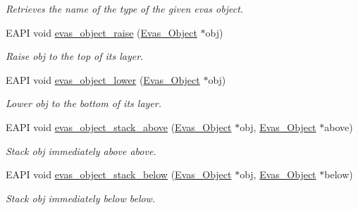\begin{DoxyCompactItemize}
\begin{DoxyCompactList}\small\item\em Retrieves the name of the type of the given evas object. \item\end{DoxyCompactList}\item 
EAPI void \hyperlink{group__Evas__Object__Group__Basic_ga7a99128189105d042cf6b4fefca9b60e}{evas\_\-object\_\-raise} (\hyperlink{group__Evas__Object__Group_ga9e19e6dd1f517a0ba437c0114d3e7c97}{Evas\_\-Object} $\ast$obj)
\begin{DoxyCompactList}\small\item\em Raise {\ttfamily obj} to the top of its layer. \item\end{DoxyCompactList}\item 
EAPI void \hyperlink{group__Evas__Object__Group__Basic_gae5ede5671799a140e3d3f7bb7ea7f14f}{evas\_\-object\_\-lower} (\hyperlink{group__Evas__Object__Group_ga9e19e6dd1f517a0ba437c0114d3e7c97}{Evas\_\-Object} $\ast$obj)
\begin{DoxyCompactList}\small\item\em Lower {\ttfamily obj} to the bottom of its layer. \item\end{DoxyCompactList}\item 
EAPI void \hyperlink{group__Evas__Object__Group__Basic_ga1128fb1e04b1de059e9ccade58c83663}{evas\_\-object\_\-stack\_\-above} (\hyperlink{group__Evas__Object__Group_ga9e19e6dd1f517a0ba437c0114d3e7c97}{Evas\_\-Object} $\ast$obj, \hyperlink{group__Evas__Object__Group_ga9e19e6dd1f517a0ba437c0114d3e7c97}{Evas\_\-Object} $\ast$above)
\begin{DoxyCompactList}\small\item\em Stack {\ttfamily obj} immediately above {\ttfamily above}. \item\end{DoxyCompactList}\item 
EAPI void \hyperlink{group__Evas__Object__Group__Basic_ga8cc69c6e6d78d686d8c4606ac03c2864}{evas\_\-object\_\-stack\_\-below} (\hyperlink{group__Evas__Object__Group_ga9e19e6dd1f517a0ba437c0114d3e7c97}{Evas\_\-Object} $\ast$obj, \hyperlink{group__Evas__Object__Group_ga9e19e6dd1f517a0ba437c0114d3e7c97}{Evas\_\-Object} $\ast$below)
\begin{DoxyCompactList}\small\item\em Stack {\ttfamily obj} immediately below {\ttfamily below}. \item\end{DoxyCompactList}\item 

\end{DoxyCompactItemize}
